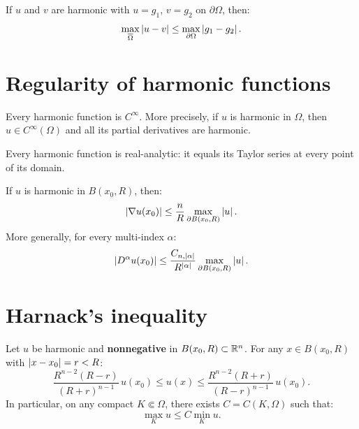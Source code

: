 \begin{corollary}[Stability]
If $u$ and $v$ are harmonic with $u = g_1$, $v = g_2$ on
$\partial\Omega$, then:
\[
    \max_{\overline{\Omega}} \left| u - v \right| \leq \max_{\partial\Omega} \left| g_1 - g_2 \right|.
\]
\end{corollary}

\section{Regularity of harmonic functions}

\begin{theorem}
\label{thm:harmonic_regularity}
Every harmonic function is $C^\infty$. More precisely, if $u$ is harmonic
in $\Omega$, then $u \in C^\infty(\Omega)$ and all its partial derivatives
are harmonic.
\end{theorem}

\begin{theorem}[Analyticity]
Every harmonic function is real-analytic: it equals its Taylor series
at every point of its domain.
\end{theorem}

\begin{theorem}
If $u$ is harmonic in $B(x_0, R)$, then:
\begin{equation}\label{eq:gradient_estimate}
    \left| \nabla u(x_0) \right| \leq \frac{n}{R}\max_{\partial B(x_0,R)} \left| u \right|.
\end{equation}
More generally, for every multi-index $\alpha$:
\[
    \left| D^\alpha u(x_0) \right| \leq \frac{C_{n,\left| \alpha \right|}}{R^{\left| \alpha \right|}}
    \max_{\partial B(x_0,R)} \left| u \right|.
\]
\end{theorem}

\section{Harnack's inequality}

\begin{theorem}
Let $u$ be harmonic and \textbf{nonnegative} in $B(x_0, R) \subset \mathbb{R}^n$.
For any $x \in B(x_0, R)$ with $\left| x - x_0 \right| = r < R$:
\begin{equation}\label{eq:harnack}
    \frac{R^{n-2}(R-r)}{(R+r)^{n-1}}\, u(x_0) \leq u(x)
    \leq \frac{R^{n-2}(R+r)}{(R-r)^{n-1}}\, u(x_0).
\end{equation}
In particular, on any compact $K \Subset \Omega$, there exists
$C = C(K, \Omega)$ such that:
\[
    \max_K u \leq C \min_K u.
\]
\end{theorem}

